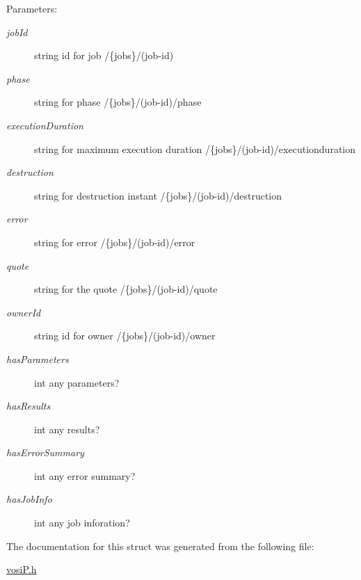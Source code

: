 \begin{Desc}
\item[Parameters:]
\begin{description}
\item[{\em jobId}]string id for job /\{jobs\}/(job-id) \item[{\em phase}]string for phase /\{jobs\}/(job-id)/phase \item[{\em executionDuration}]string for maximum execution duration /\{jobs\}/(job-id)/executionduration \item[{\em destruction}]string for destruction instant /\{jobs\}/(job-id)/destruction \item[{\em error}]string for error /\{jobs\}/(job-id)/error \item[{\em quote}]string for the quote /\{jobs\}/(job-id)/quote \item[{\em ownerId}]string id for owner /\{jobs\}/(job-id)/owner \item[{\em hasParameters}]int any parameters? \item[{\em hasResults}]int any results? \item[{\em hasErrorSummary}]int any error summary? \item[{\em hasJobInfo}]int any job inforation? \end{description}
\end{Desc}


The documentation for this struct was generated from the following file:\begin{CompactItemize}
\item 
\hyperlink{vosiP_8h}{vosiP.h}\end{CompactItemize}
